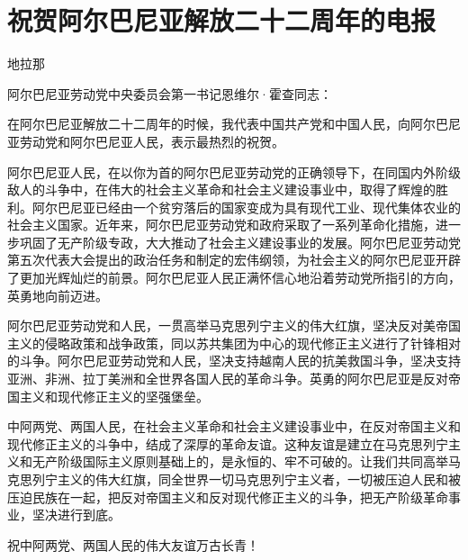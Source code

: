 \section[祝贺阿尔巴尼亚解放二十二周年的电报（一九六六年十一月二十八日）]{祝贺阿尔巴尼亚解放二十二周年的电报}


地拉那

阿尔巴尼亚劳动党中央委员会第一书记恩维尔·霍查同志：

在阿尔巴尼亚解放二十二周年的时候，我代表中国共产党和中国人民，向阿尔巴尼亚劳动党和阿尔巴尼亚人民，表示最热烈的祝贺。

阿尔巴尼亚人民，在以你为首的阿尔巴尼亚劳动党的正确领导下，在同国内外阶级敌人的斗争中，在伟大的社会主义革命和社会主义建设事业中，取得了辉煌的胜利。阿尔巴尼亚已经由一个贫穷落后的国家变成为具有现代工业、现代集体农业的社会主义国家。近年来，阿尔巴尼亚劳动党和政府采取了一系列革命化措施，进一步巩固了无产阶级专政，大大推动了社会主义建设事业的发展。阿尔巴尼亚劳动党第五次代表大会提出的政治任务和制定的宏伟纲领，为社会主义的阿尔巴尼亚开辟了更加光辉灿烂的前景。阿尔巴尼亚人民正满怀信心地沿着劳动党所指引的方向，英勇地向前迈进。

阿尔巴尼亚劳动党和人民，一贯高举马克思列宁主义的伟大红旗，坚决反对美帝国主义的侵略政策和战争政策，同以苏共集团为中心的现代修正主义进行了针锋相对的斗争。阿尔巴尼亚劳动党和人民，坚决支持越南人民的抗美救国斗争，坚决支持亚洲、非洲、拉丁美洲和全世界各国人民的革命斗争。英勇的阿尔巴尼亚是反对帝国主义和现代修正主义的坚强堡垒。

中阿两党、两国人民，在社会主义革命和社会主义建设事业中，在反对帝国主义和现代修正主义的斗争中，结成了深厚的革命友谊。这种友谊是建立在马克思列宁主义和无产阶级国际主义原则基础上的，是永恒的、牢不可破的。让我们共同高举马克思列宁主义的伟大红旗，同全世界一切马克思列宁主义者，一切被压迫人民和被压迫民族在一起，把反对帝国主义和反对现代修正主义的斗争，把无产阶级革命事业，坚决进行到底。

祝中阿两党、两国人民的伟大友谊万古长青！


